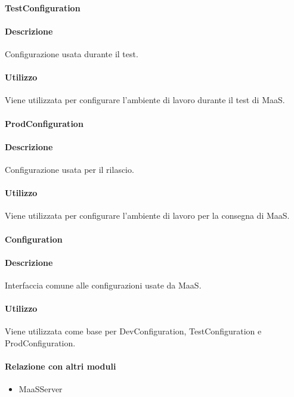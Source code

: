 \paragraph{TestConfiguration}
\paragraph*{Descrizione}
Configurazione usata durante il test.

\paragraph*{Utilizzo}
Viene utilizzata per configurare l'ambiente di lavoro durante il test di MaaS.

\paragraph{ProdConfiguration}
\paragraph*{Descrizione}
Configurazione usata per il rilascio.

\paragraph*{Utilizzo}
Viene utilizzata per configurare l'ambiente di lavoro per la consegna di MaaS.

\paragraph{Configuration}
\paragraph*{Descrizione}
Interfaccia comune alle configurazioni usate da MaaS.

\paragraph*{Utilizzo}
Viene utilizzata come base per DevConfiguration, TestConfiguration e ProdConfiguration.

\paragraph*{Relazione con altri moduli}
\begin{itemize}
\item MaaSServer
\end{itemize}

